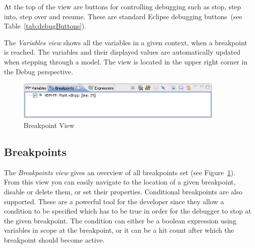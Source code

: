 At the top of the view are buttons for controlling debugging such as stop, step
into, step over and resume. These are standard Eclipse debugging
buttons~(see Table~\ref{tab:debugButtons}).

The \emph{Variables view} shows all the variables in a given context,
when a breakpoint is reached. The variables and their displayed values
are automatically updated when stepping through a model. The view is
located in the upper right corner in the Debug perspective.


\begin{figure}[htp]
\begin{center}
  \includegraphics[width=4in]{figures/BreakpointView}
  \caption{Breakpoint View}
  \label{fig:BreakpointView}
\end{center}
\end{figure}

\subsection{Breakpoints}

The \emph{Breakpoints view} gives an overview of all breakpoints set
(see Figure~\ref{fig:BreakpointView}). From this view you
can easily navigate to the location of a given breakpoint, disable or
delete them, or set their properties.
Conditional breakpoints are also supported. These are a powerful tool for
the developer since they allow a condition to be specified which has
to be true in order for the debugger to stop at the given
breakpoint. The condition can either be a boolean expression using
variables in scope at the breakpoint, or it can be a hit count after
which the breakpoint should become active.

